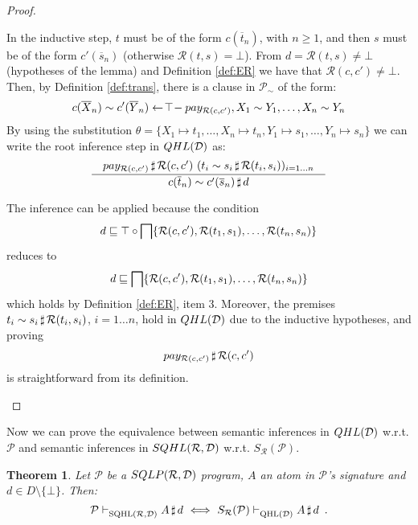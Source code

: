 \documentclass{sigplanconf}
\newcommand{\qdom}{\mathcal{D}} \newcommand{\dqdom}{D \setminus \{\bot\}} \newcommand{\bqdom}{(D \setminus \{\bot\}) \uplus \{?\}}
\newcommand{\simrel}{\mathcal{R}}
\newcommand{\trans}[2]{S_{#1}(#2)}
\newcommand{\Prog}{\mathcal{P}} \newcommand{\UProg}{\mathcal{P_U}}
\theoremstyle{definition}
\theoremstyle{plain}
\newtheorem{theorem}{Theorem}
\begin{document}
\begin{proof}
\begin{enumerate}
In the inductive step, $t$ must be of the form $c(\overline{t}_n)$, with $n \geq 1$, and then $s$ must be of the form $c'(\overline{s}_n)$ (otherwise $\simrel(t,s) = \bot$). From $d=\simrel(t,s) \neq \bot$ (hypotheses of the lemma) and Definition \ref{def:ER} we have that $\simrel(c,c') \neq \bot$. Then, by Definition \ref{def:trans}, there is a clause in $ \Prog_\sim$ of the form: {\small $$c(\overline{X}_n) \sim c'(\overline{Y}_n) \qgets{\top} pay_{\simrel(c,c')}, X_1 \sim Y_1, \dots, X_n \sim Y_n$$ } By using the substitution $\theta=\{X_1 \mapsto t_1, \dots, X_n \mapsto t_n, Y_1 \mapsto s_1, \dots, Y_n \mapsto s_n \}$ we can write the root inference step in $\qhl{\qdom}$ as:
    \[ \frac
        {\quad \at{pay_{\simrel(c,c')}}{\simrel(c,c')}\ (\at{t_i \sim s_i}{\simrel(t_i,s_i)})_{i=1\dots n} \quad}
        {\at{c (\overline{t}_n) \sim c'(\overline{s}_n)}{d}}
    \]

The inference can be applied because the condition $$d \sqsubseteq \top \circ \infi \{\simrel(c,c'), \simrel(t_1,s_1), \dots, \simrel(t_n,s_n) \}$$ reduces to $$d \sqsubseteq \infi \{\simrel(c,c'),  \simrel(t_1,s_1), \dots, \simrel(t_n,s_n) \}$$ which holds by Definition \ref{def:ER}, item 3. Moreover, the premises $\at{t_i \sim s_i}{\simrel(t_i,s_i)}$, $i=1 \dots n$, hold in $\qhl{\qdom}$ due to the inductive hypotheses, and proving $${\at{pay_{\simrel(c,c')}}{\simrel(c,c')}}$$ is straightforward from its definition.\qedhere
\end{enumerate}
\end{proof}

Now we can prove the equivalence between semantic inferences in $\qhl{\qdom}$ w.r.t. $\mathcal{P}$ and semantic inferences in $\sqhl{\simrel}{\qdom}$ w.r.t. $\trans{\simrel}{\Prog}$.

\begin{theorem} \label{th:equivalence}
Let $\mathcal{P}$ be a $\sqlp{\simrel}{\qdom}$ program,  $A$ an atom in $\Prog$'s signature and $d \in \dqdom$. Then:
$$
\Prog \sqhlrd \at{A}{d}\ \Longleftrightarrow\ \trans{\simrel}{\Prog}
\qhld \at{A}{d} \enspace .
$$
\end{theorem}
\end{document}
